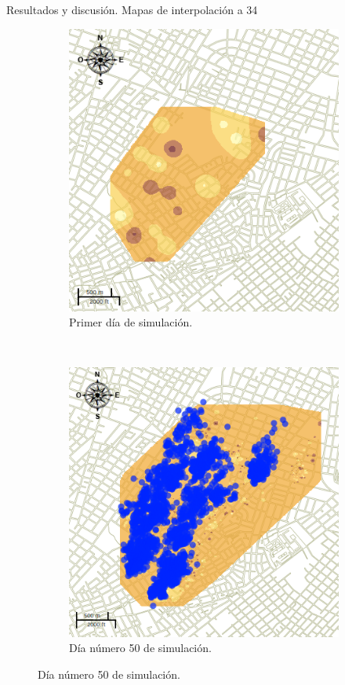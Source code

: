 \begin{frame}[t]{Resultados y discusión. Mapas de interpolación a 34 \textcelsius}
    \begin{figure}
    \begin{subfigure}[b]{0.45\textwidth}
        \includegraphics[width=\textwidth]{./graphics/inicial.png}
        \caption{ Primer día de simulación.}
    \end{subfigure}
    ~~~~
    \begin{subfigure}[b]{0.45\textwidth}
        \includegraphics[width=\textwidth]{./graphics/temp-34-final.png}
        \caption{Día número 50 de simulación.}
    \end{subfigure}
    \end{figure}
\end{frame}
